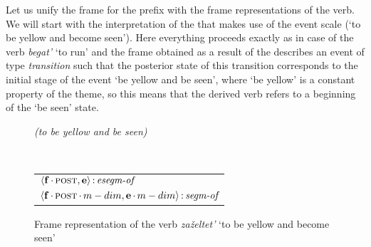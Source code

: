 Let us unify the frame for the prefix  with the frame representations of the verb. We will start with the interpretation of the  that makes use of the event scale (`to be yellow and become seen'). Here everything proceeds exactly as in case of the verb \textit{begat'} `to run' and the frame obtained as a result of the  describes an event of type \textit{transition} such that the posterior state of this transition corresponds to the initial stage of the event `be yellow and be seen', where `be yellow' is a constant property of the theme, so this means that the derived verb refers to a beginning of the `be seen' state.

\begin{figure}
\begin{minipage}[b]{.5\textwidth}\centering
\textit{ (to be yellow and be seen)}\\
\end{minipage}%
\begin{minipage}[b]{.5\textwidth}\centering
{}
\end{minipage}\medskip\\
\begin{tabular}[t]{l}
$\langle{\textbf{\textrm{f}}\,{\cdot}\,\textsc{post},\textbf{\textrm{e}}}\rangle\,{:}\,\textit{esegm-of}$\\[1ex]
$\tuple{\btag{f}\BC\POST\C\MDIM,\btag{e}\BC\MDIM}\D\type{segm-of}$\\
\end{tabular}
\caption{Frame representation of the verb \textit{za\v{z}eltet'} `to be yellow and become seen' \label{frame:zazeltet:seen}}
\end{figure}

